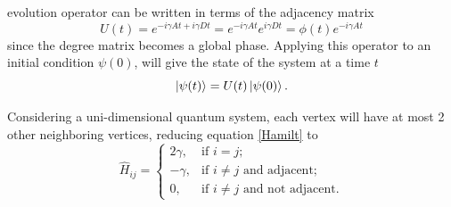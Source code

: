 \documentclass[../../dissertation.tex]{subfiles}
\begin{document}
evolution operator can be written in terms of the adjacency matrix 
\begin{equation}
	U(t) = e^{-i\gamma A t + i\gamma D t} = e^{-i\gamma A t} e^{i\gamma D t} = \phi(t) e^{-i\gamma A t} 
	\label{eq:contSimulUniOp}
\end{equation}
since the degree matrix becomes a global phase.
Applying this operator to an initial condition $\psi(0)$, will give the state
of the system at a time $t$
\begin{equation}
	\ket{\psi(t)} = U(t)\ket{\psi(0)}.
\end{equation}\par

Considering a uni-dimensional quantum system, each vertex
will have at most 2 other neighboring vertices, reducing equation \eqref{Hamilt}
to
\begin{equation}
	\hat{H}_{ij} = \begin{cases} 
		2\gamma, & \mbox{if } i= j; \\ 
		-\gamma, & \mbox{if } i\neq j\mbox{ and adjacent};\\
		0, & \mbox{if } i\neq j\mbox{ and not adjacent}.
	\end{cases}
\end{equation}\par
\end{document}
